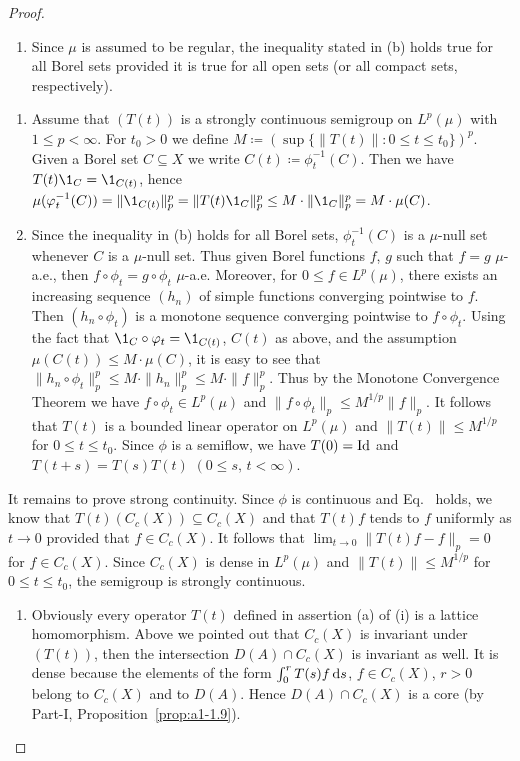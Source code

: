 \begin{proof}
\begin{enumerate}[\upshape (i), wide, labelindent=.25em]
\item
Since $\mu$ is assumed to be regular, the inequality stated in (b) holds true for all Borel sets provided it is true for all open sets (or all compact sets, respectively).
\end{enumerate}
\begin{enumerate}[wide, labelindent=.25em]

\item[(a) $\Rightarrow$ (b):] 
Assume that $(T(t))$ is a strongly continuous semigroup on
$L^p(\mu)$ with $1 \leq p < \infty$. For $t_0 > 0$ we define $M \coloneq  (\sup\{\|T(t)\| \colon 0 \leq t \leq t_0\})^{p}$.
Given a Borel set $C \subseteq X$ we write $C(t) \coloneq  \phi_t^{-1}(C)$.
Then we have $T(t)\1_C = \1_{C(t)}$, hence
$\mu(\phi_t^{-1}(C)) = \|\1_{C(t)}\|_p^p = \|T(t)\1_C\|_p^p \leq M \cdot \|\1_C\|_p^p = M \cdot \mu(C)$.

\item[(b) $\Rightarrow$ (a):] 
Since the inequality in (b) holds for all Borel sets,
$\phi_t^{-1}(C)$ is a $\mu$-null set whenever $C$ is a $\mu$-null set. 
Thus given
Borel functions $f$, $g$ such that $f = g$ $\mu$-a.e., then $f \circ \phi_t = g \circ \phi_t$
$\mu$-a.e. 
Moreover, for $0 \leq f \in L^p(\mu)$, there exists an increasing
sequence $(h_n)$ of simple functions converging pointwise to $f$. Then
$(h_n \circ \phi_t)$ is a monotone sequence converging pointwise to $f \circ \phi_t$. Using
the fact that $\1_C \circ \phi_t = \1_{C(t)}$, $C(t)$ as above, and the assumption
$\mu(C(t)) \leq M \cdot \mu(C)$, it is easy to see that $\|h_n \circ \phi_t\|_p^p \leq M \cdot \|h_n\|_p^p \leq M \cdot \|f\|_p^p$.
Thus by the Monotone Convergence Theorem we have $f \circ \phi_t \in L^p(\mu)$ and
$\|f \circ \phi_t\|_p \leq M^{1/p}\|f\|_p$. It follows that $T(t)$ is a bounded linear
operator on $L^p(\mu)$ and $\|T(t)\| \leq M^{1/p}$ for $0 \leq t \leq t_0$. Since $\phi$ is a
semiflow, we have $T(0) = \operatorname{Id} $ and $T(t+s) = T(s)T(t)$ $(0 \leq s,\,t < \infty)$. 
\end{enumerate}
It remains to prove strong continuity. Since $\phi$ is continuous and Eq.~
holds, we know that $T(t)(C_c(X)) \subseteq C_c(X)$ and that $T(t)f$ tends to $f$
uniformly as $t \to 0$ provided that $f \in C_c(X)$. It follows that
$\lim_{t \to 0}\|T(t)f - f\|_p = 0$ for $f \in C_c(X)$. Since $C_c(X)$ is dense in
$L^p(\mu)$ and $\|T(t)\| \leq M^{1/p}$ for $0 \leq t \leq t_0$, the semigroup is strongly
continuous.
\begin{enumerate}[\upshape (i), wide, labelindent=.25em, start=2]
\item
Obviously every operator $T(t)$ defined in assertion (a) of (i)
is a lattice homomorphism. Above we pointed out that $C_c(X)$ is
invariant under $(T(t))$, then the intersection $D(A) \cap C_c(X)$ is invariant as well. It
is dense because the elements of the form $\int_{0}^{r} T(s)f \mathop{}\!\mathrm{d}{s}$, $f \in C_c(X)$,
$r > 0$ belong to $C_c(X)$ and to $D(A)$. Hence $D(A) \cap C_c(X)$ is a core%
(by Part-I, Proposition~\ref{prop:a1-1.9}).
\qedhere
\end{enumerate}
\end{proof}

